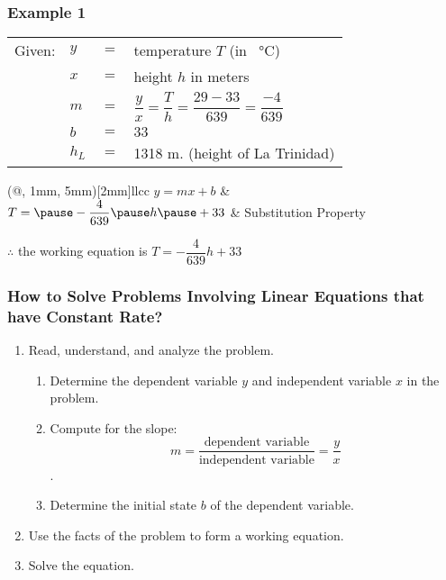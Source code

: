 \documentclass[14pt]{beamer}
\begin{document}
    \begin{frame}
    	\frametitle{Example 1}

    	\begin{tabular}{llll}
    		Given: &  $ y $ & $ = $ & temperature $ T $ (in \SI{}{\celsius}) \\
    		&  $ x $ & $ = $ & height $ h $ in meters \\
    		&  $ m $ & $ = $ & $ \dfrac{y}{x}  = \dfrac{T}{h} =  \dfrac{29 - 33}{639}  = \dfrac{-4}{639}$ \\
    		&  $ b $ & $ = $ & $ 33 $ \\
    		& $ h_L $ & $ = $ & 1318 m. (height of La Trinidad) \\
    	\end{tabular}
    
    \vhalf
        \begin{TAB}(@, 1mm, 5mm)[2mm]{ll}{cc}
        	\pause  $ y = mx + b $ &  \\
        	
        	\pause $ T = \pause -\dfrac{4}{639} \pause h \pause + 33 $  & Substitution Property \\
        \end{TAB}
    
    \pause $ \therefore $ the working equation is $ T = -\dfrac{4}{639} h + 33 $ 
    \end{frame}

    \begin{frame}
    	\frametitle{How to Solve Problems Involving Linear Equations that have Constant Rate?}
    	\footnotesize
    	\begin{enumerate}  
    		\item Read, understand, and analyze the problem. 
    		\begin{enumerate}
    			\footnotesize
    			\item  Determine the dependent variable $ y $ and independent variable $ x $ in the problem.
    			\item  Compute for the slope:  \[ m = \dfrac{\text{dependent variable} }{\text{independent variable}} = \dfrac{y}{x} \] .
    			\item  Determine the initial state $ b $ of the dependent variable.
    		\end{enumerate}
    		\item  Use the facts of the problem to form a working equation.
    		\item  Solve the equation.			
    	\end{enumerate}  
    \end{frame}
\end{document}
